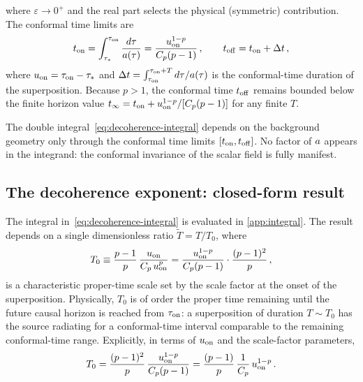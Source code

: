 %
where $\varepsilon \to 0^{+}$ and the real part selects the physical (symmetric)
contribution.  The conformal time limits are
%
\begin{equation}
  t_{\rm on}
  =
  \int_{\tau_{*}}^{\tau_{\rm on}} \frac{d\tau}{a(\tau)}
  =
  \frac{u_{\rm on}^{1-p}}{C_{p}(p-1)} \,,
  \qquad
  t_{\rm off} = t_{\rm on} + \Delta t \,,
  \label{eq:conformal-limits}
\end{equation}
%
where $u_{\rm on} = \tau_{\rm on} - \tau_{*}$ and $\Delta t = \int_{\tau_{\rm on}}^{\tau_{\rm on}+T} d\tau/a(\tau)$ is the conformal-time duration of the superposition.  Because $p > 1$, the conformal time $t_{\rm off}$ remains bounded below the finite horizon value $t_{\infty} = t_{\rm on} + u_{\rm on}^{1-p}/[C_{p}(p-1)]$ for any finite $T$.

The double integral~\cref{eq:decoherence-integral} depends on the background
geometry only through the conformal time limits $[t_{\rm on}, t_{\rm off}]$.  No
factor of $a$ appears in the integrand: the conformal invariance of the
scalar field is fully manifest.

\subsection{The decoherence exponent: closed-form result}
\label{sec:powerlaw-result}

The integral in~\cref{eq:decoherence-integral} is evaluated in
\cref{app:integral}.  The result depends on a single dimensionless ratio
$\widetilde{T} = T/T_{0}$, where
%
\begin{equation}
  T_{0}
  \equiv
  \frac{p-1}{p}\,
  \frac{u_{\rm on}}{C_{p}\,u_{\rm on}^{p}}
  =
  \frac{u_{\rm on}^{1-p}}{C_{p}(p-1)}\cdot\frac{(p-1)^{2}}{p}
  \,,
  \label{eq:T0-def}
\end{equation}
%
is a characteristic proper-time scale set by the scale factor at the onset of
the superposition.  Physically, $T_{0}$ is of order the proper time remaining
until the future causal horizon is reached from $\tau_{\rm on}$: a superposition
of duration $T \sim T_{0}$ has the source radiating for a conformal-time interval
comparable to the remaining conformal-time range.  Explicitly, in terms of
$u_{\rm on}$ and the scale-factor parameters,
%
\begin{equation}
  T_{0} = \frac{(p-1)^{2}}{p}\,
  \frac{u_{\rm on}^{1-p}}{C_{p}(p-1)}
  = \frac{(p-1)}{p}\,
  \frac{1}{C_{p}}\, u_{\rm on}^{1-p} \,.
  \label{eq:T0-explicit}
\end{equation}
%

